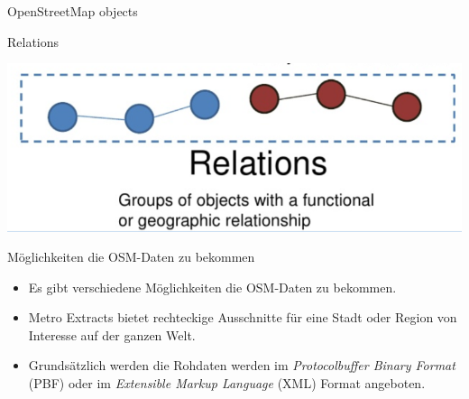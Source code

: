 \documentclass[ignorenonframetext,]{beamer}
\providecommand{\tightlist}{%
  \setlength{\itemsep}{0pt}\setlength{\parskip}{0pt}}
\begin{document}
\begin{frame}{OpenStreetMap objects}
\protect\hypertarget{openstreetmap-objects-1}{}

\begin{block}{Relations}

\includegraphics{figure/relations.PNG}

\end{block}

\end{frame}

\begin{frame}{Möglichkeiten die OSM-Daten zu bekommen}
\protect\hypertarget{moglichkeiten-die-osm-daten-zu-bekommen}{}

\begin{itemize}
\tightlist
\item
  Es gibt verschiedene Möglichkeiten die OSM-Daten zu bekommen.
\item
  Metro Extracts bietet rechteckige Ausschnitte für eine Stadt oder
  Region von Interesse auf der ganzen Welt.
\item
  Grundsätzlich werden die Rohdaten werden im \emph{Protocolbuffer
  Binary Format} (PBF) oder im \emph{Extensible Markup Language} (XML)
  Format angeboten.
\end{itemize}

\end{frame}
\end{document}
